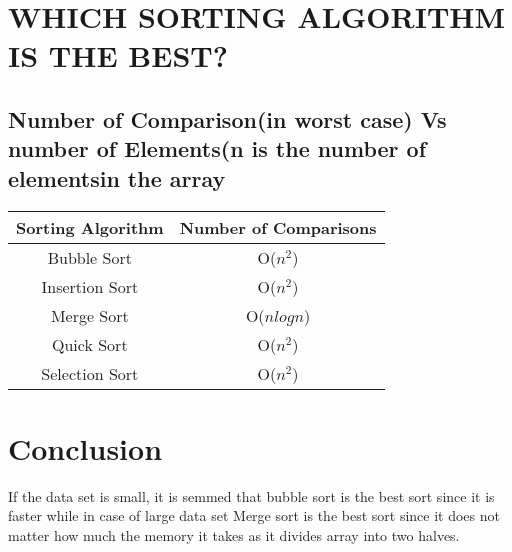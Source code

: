 \documentclass{IEEEtran}
\begin{document}
\section{WHICH SORTING ALGORITHM IS THE BEST?}
\subsection{Number of Comparison(in worst case) Vs number of Elements(n is the number of elementsin the array}

\begin{tabular}{|c|c|}
\\
\hline 
Sorting Algorithm & Number of Comparisons\\
\hline 
Bubble Sort & O($n^2$)\\
\hline 
Insertion Sort & O($n^2$)\\
\hline 
Merge Sort & O($nlogn$)\\
\hline 
Quick Sort & O($n^2$)\\
\hline 
Selection Sort & O($n^2$)\\
\hline 
\end{tabular} 
\section{Conclusion}
If the data set is small, it is semmed that bubble sort is the best sort since it is faster while in case of large data set Merge sort is the best sort since it does not matter how much the memory it takes as it divides array into two halves.
\end{document}
